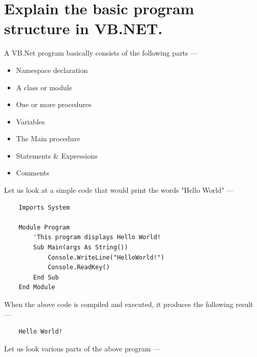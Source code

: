 \documentclass[11pt,dvipsnames,cmyk]{article}
\begin{document}
	\section*{Explain the basic program structure in VB.NET.}
	A VB.Net program basically consists of the following parts ---
	\begin{itemize}
		\item Namespace declaration
		\item A class or module
		\item One or more procedures
		\item Variables
		\item The Main procedure
		\item Statements \& Expressions
		\item Comments
	\end{itemize}
	Let us look at a simple code that would print the words "Hello World" ---
	\lstset{style=vb}
	\begin{lstlisting}
	Imports System
	
	Module Program
		'This program displays Hello World!
		Sub Main(args As String())
			Console.WriteLine("HelloWorld!")
			Console.ReadKey()
		End Sub
	End Module
	\end{lstlisting}
	When the above code is compiled and executed, it produces the following result ---
	\begin{verbatim}
	Hello World!
	\end{verbatim}
	Let us look various parts of the above program ---
\end{document}
